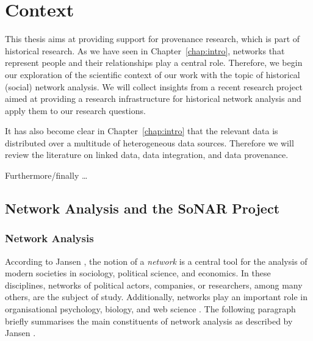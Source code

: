 \chapter{Context}
\label{chap:rel_work}
\label{chap:context}

This thesis aims at providing support for provenance research, which is part of historical research.
As we have seen in Chapter~\ref{chap:intro}, networks that represent
people and their relationships play a central role.
Therefore, we begin our exploration of the scientific context of our work
with the topic of historical (social) network analysis.
We will collect insights from a recent research project
aimed at providing a research infrastructure for historical network analysis
and apply them to our research questions.

It has also become clear in Chapter~\ref{chap:intro} that the relevant data is distributed 
over a multitude of heterogeneous data sources.
Therefore we will review the literature on linked data, data integration,
and data provenance.

Furthermore/finally \dots



\section{Network Analysis and the SoNAR Project}
\label{sec:HNA+SoNAR}


\subsection{Network Analysis}

According to Jansen \autocite*{Jansen2003},
the notion of a \emph{network} is a central tool for the analysis
of modern societies in sociology, political science, and economics.
In these disciplines, networks of political actors, companies, or researchers,
among many others, are the subject of study.
Additionally, networks play an important role
in organisational psychology, biology, and web science \autocite{WikiSNAGerman,WikiNetworkAnalysis}.
The following
paragraph briefly summarises the main constituents of network analysis
as described by Jansen \autocite*{Jansen2003}.

